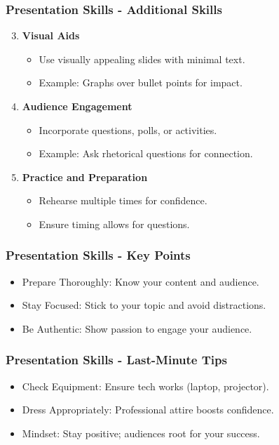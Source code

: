 \documentclass[aspectratio=169]{beamer}
\begin{document}
\begin{frame}[fragile]
    \frametitle{Presentation Skills - Additional Skills}
    \begin{enumerate}
        \setcounter{enumi}{2} %
        \item \textbf{Visual Aids}
            \begin{itemize}
                \item Use visually appealing slides with minimal text.
                \item Example: Graphs over bullet points for impact.
            \end{itemize}
        
        \item \textbf{Audience Engagement}
            \begin{itemize}
                \item Incorporate questions, polls, or activities.
                \item Example: Ask rhetorical questions for connection.
            \end{itemize}

        \item \textbf{Practice and Preparation}
            \begin{itemize}
                \item Rehearse multiple times for confidence.
                \item Ensure timing allows for questions.
            \end{itemize}
    \end{enumerate}
\end{frame}

\begin{frame}[fragile]
    \frametitle{Presentation Skills - Key Points}
    \begin{itemize}
        \item Prepare Thoroughly: Know your content and audience.
        \item Stay Focused: Stick to your topic and avoid distractions.
        \item Be Authentic: Show passion to engage your audience.
    \end{itemize}
\end{frame}

\begin{frame}[fragile]
    \frametitle{Presentation Skills - Last-Minute Tips}
    \begin{itemize}
        \item Check Equipment: Ensure tech works (laptop, projector).
        \item Dress Appropriately: Professional attire boosts confidence.
        \item Mindset: Stay positive; audiences root for your success.
    \end{itemize}
\end{frame}
\end{document}
